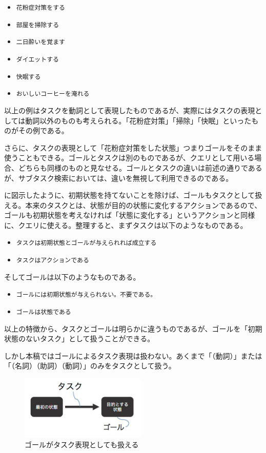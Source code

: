 \documentclass[submit,techreq]{ipsj}
\def\|{\verb|}
\begin{document}
\begin{itemize}
\item \|花粉症対策をする|
\item \|部屋を掃除する|
\item \|二日酔いを覚ます|
\item \|ダイエットする|
\item \|快眠する|
\item \|おいしいコーヒーを淹れる|
\end{itemize}

以上の例はタスクを動詞として表現したものであるが、実際にはタスクの表現としては動詞以外のものも考えられる。「花粉症対策」「掃除」「快眠」といったものがその例である。

さらに、タスクの表現として「花粉症対策をした状態」つまりゴールをそのまま使うこともできる。ゴールとタスクは別のものであるが、クエリとして用いる場合、どちらも同様のものと見なせる。ゴールとタスクの違いは前述の通りであるが、サブタスク検索においては、違いを無視して利用できるのである。

に図示したように、初期状態を持てないことを除けば、ゴールもタスクとして扱える。本来のタスクとは、状態が目的の状態に変化するアクションであるので、ゴールも初期状態を考えなければ「状態に変化する」というアクションと同様に、クエリに使える。整理すると、まずタスクは以下のようなものである。

\begin{itemize}
\item \|タスクは初期状態とゴールが与えられれば成立する|
\item \|タスクはアクションである|
\end{itemize}

そしてゴールは以下のようなものである。

\begin{itemize}
\item \|ゴールには初期状態が与えられない。不要である。|
\item \|ゴールは状態である|
\end{itemize}


以上の特徴から、タスクとゴールは明らかに違うものであるが、ゴールを「初期状態のないタスク」として扱うことができる。

しかし本稿ではゴールによるタスク表現は扱わない。あくまで「（動詞）」または「（名詞）（助詞）（動詞）」のみをタスクとして扱う。


\begin{figure}[tb]
\includegraphics[width=6cm, bb=0 0 350 319]{goal_can_be_task.jpg}
\caption{ゴールがタスク表現としても扱える}
\label{fig:goal_can_be_task}
\end{figure}
\end{document}
